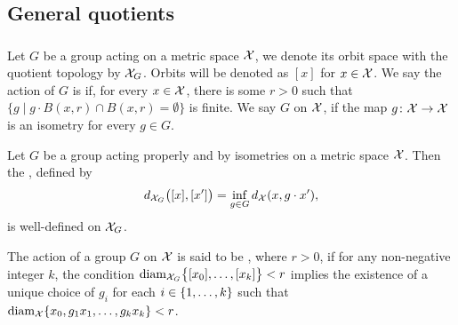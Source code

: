 
\subsection{General quotients}

\subsubsection{}


Let $G$ be a group acting on a metric space $\cX$, we denote its orbit space with the quotient topology by $\cX_G$.
Orbits will be denoted as $[x]$ for $x \in \cX$.
We say the action of $G$ is  if, for every $x \in \cX$, there is some $r>0$ such that $\{g \mid g\cdot B(x,r) \cap B(x,r) = \emptyset\}$ is finite.
We say $G$  on $\cX$, if the map $g \colon \cX \to \cX$ is an isometry for every $g \in G$.

Let $G$ be a group acting properly and by isometries on a metric space $\cX$.
Then the , defined by
\[
d_{\cX_G}\big([x], [x']\big) = \inf_{g \in G} d_\cX(x, g \cdot x'),
\]
is well-defined on $\cX_G$.

The action of a group $G$ on $\cX$ is said to be , where $r > 0$, if for any non-negative integer $k$, the condition $\diam_{\cX_G}\set[\big]{[x_0],\dots,[x_k]} < r$ implies the existence of a unique choice of $g_i$ for each $i \in \set{1,\dots,k}$ such that $\diam_{\cX}\set{x_0, g_1x_1, \dots, g_kx_k} < r$.

\subsubsection{}\label{subsub:h}


